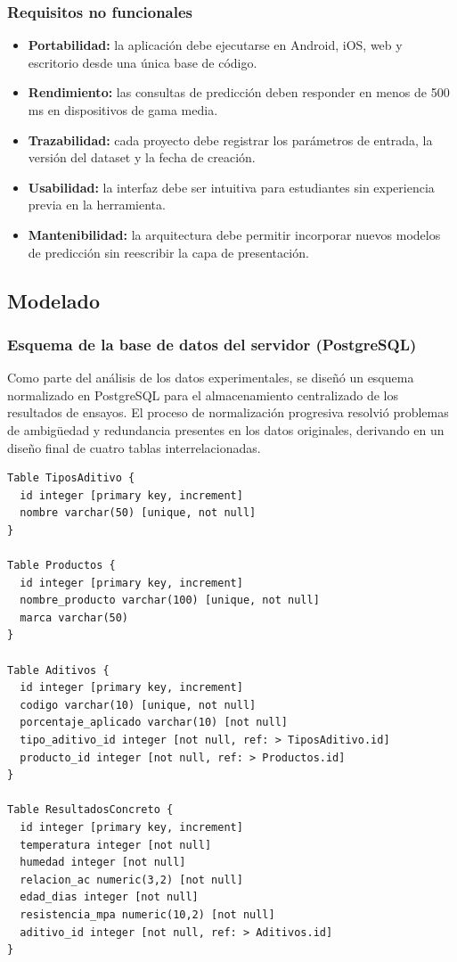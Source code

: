 \subsubsection*{Requisitos no funcionales}
\begin{itemize}
    \item \textbf{Portabilidad:} la aplicación debe ejecutarse en Android, iOS, web y escritorio desde una única base de código.
    \item \textbf{Rendimiento:} las consultas de predicción deben responder en menos de 500\,ms en dispositivos de gama media.
    \item \textbf{Trazabilidad:} cada proyecto debe registrar los parámetros de entrada, la versión del dataset y la fecha de creación.
    \item \textbf{Usabilidad:} la interfaz debe ser intuitiva para estudiantes sin experiencia previa en la herramienta.
    \item \textbf{Mantenibilidad:} la arquitectura debe permitir incorporar nuevos modelos de predicción sin reescribir la capa de presentación.
\end{itemize}

\subsection{Modelado}

\subsubsection*{Esquema de la base de datos del servidor (PostgreSQL)}

Como parte del análisis de los datos experimentales, se diseñó un esquema normalizado en PostgreSQL para el almacenamiento centralizado de los resultados de ensayos. El proceso de normalización progresiva resolvió problemas de ambigüedad y redundancia presentes en los datos originales, derivando en un diseño final de cuatro tablas interrelacionadas.

\begin{lstlisting}[style=dbmlstyle, caption=Esquema de la base de datos en DBML (PostgreSQL).]
Table TiposAditivo {
  id integer [primary key, increment]
  nombre varchar(50) [unique, not null]
}

Table Productos {
  id integer [primary key, increment]
  nombre_producto varchar(100) [unique, not null]
  marca varchar(50)
}

Table Aditivos {
  id integer [primary key, increment]
  codigo varchar(10) [unique, not null]
  porcentaje_aplicado varchar(10) [not null]
  tipo_aditivo_id integer [not null, ref: > TiposAditivo.id]
  producto_id integer [not null, ref: > Productos.id]
}

Table ResultadosConcreto {
  id integer [primary key, increment]
  temperatura integer [not null]
  humedad integer [not null]
  relacion_ac numeric(3,2) [not null]
  edad_dias integer [not null]
  resistencia_mpa numeric(10,2) [not null]
  aditivo_id integer [not null, ref: > Aditivos.id]
}
\end{lstlisting}

